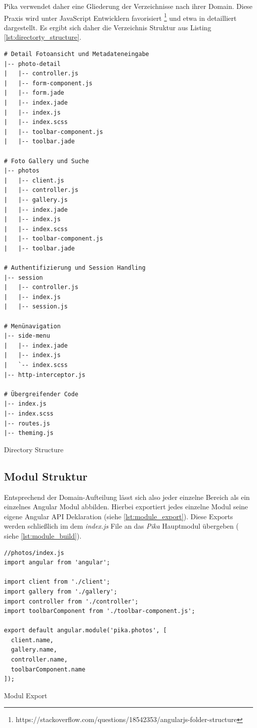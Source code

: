 Pika verwendet daher eine Gliederung der Verzeichnisse nach ihrer Domain. Diese Praxis wird unter JavaScript Entwicklern favorisiert \footnote{https://stackoverflow.com/questions/18542353/angularjs-folder-structure} und etwa in \cite{Kukic:2014} detailliert dargestellt. Es ergibt sich daher die Verzeichnis Struktur aus Listing \ref{lst:directorty_structure}.


\begin{listing}[H]
\begin{verbatim}
# Detail Fotoansicht und Metadateneingabe
|-- photo-detail
|   |-- controller.js
|   |-- form-component.js
|   |-- form.jade
|   |-- index.jade
|   |-- index.js
|   |-- index.scss
|   |-- toolbar-component.js
|   |-- toolbar.jade

# Foto Gallery und Suche
|-- photos
|   |-- client.js
|   |-- controller.js
|   |-- gallery.js
|   |-- index.jade
|   |-- index.js
|   |-- index.scss
|   |-- toolbar-component.js
|   |-- toolbar.jade

# Authentifizierung und Session Handling
|-- session
|   |-- controller.js
|   |-- index.js
|   |-- session.js

# Menünavigation
|-- side-menu
|   |-- index.jade
|   |-- index.js
|   `-- index.scss
|-- http-interceptor.js

# Übergreifender Code
|-- index.js
|-- index.scss
|-- routes.js
|-- theming.js
\end{verbatim}
\caption{Directory Structure}
\label{lst:directorty_structure}
\end{listing}

\subsection{Modul Struktur}

Entsprechend der Domain-Aufteilung lässt sich also jeder einzelne Bereich als ein einzelnes Angular Modul abbilden. Hierbei exportiert jedes einzelne Modul seine eigene Angular API Deklaration (siehe \ref{lst:module_export}). Diese Exports werden schließlich im dem \textit{index.js} File an das \textit{Pika} Hauptmodul übergeben ( siehe \ref{lst:module_build}).


\begin{listing}[H]
\begin{verbatim}
//photos/index.js
import angular from 'angular';

import client from './client';
import gallery from './gallery';
import controller from './controller';
import toolbarComponent from './toolbar-component.js';

export default angular.module('pika.photos', [
  client.name,
  gallery.name,
  controller.name,
  toolbarComponent.name
]);

\end{verbatim}
\caption{Modul Export}
\label{lst:module_export}
\end{listing}

